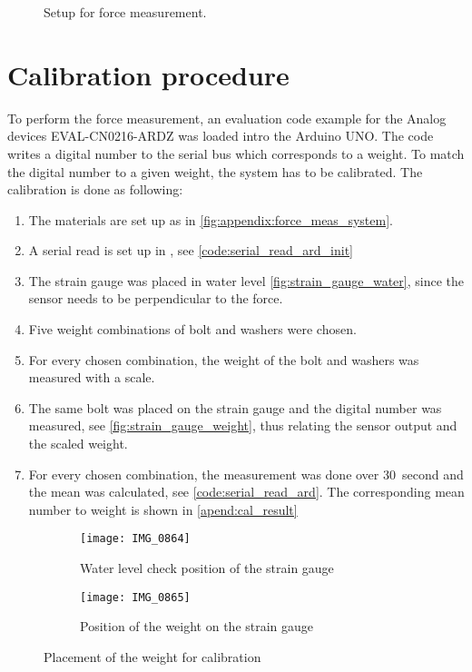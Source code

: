 \begin{figure}[H]
\centering
\def\svgwidth{\columnwidth}

%
\caption{Setup for force measurement.}
		\label{fig:appendix:force_meas_system}
\end{figure}

\section*{Calibration procedure}
To perform the force measurement, an evaluation code example for the Analog devices EVAL-CN0216-ARDZ was loaded intro the Arduino UNO. The code writes a digital number to the serial bus which corresponds to a weight. To match the digital number to a given weight, the system has to be calibrated. The calibration is done as following: 

\begin{enumerate}
\item The materials are set up as in \autoref{fig:appendix:force_meas_system}.
\item A serial read is set up in \matlab, see \autoref{code:serial_read_ard_init}
\item The strain gauge was placed in water level \autoref{fig:strain_gauge_water}, since the sensor needs to be perpendicular to the force.
\item  Five weight combinations of bolt and washers were chosen.
\item  For every chosen combination, the weight of the bolt and washers was measured with a scale.
\item The same bolt was placed on the strain gauge and the digital number was measured, see \autoref{fig:strain_gauge_weight}, thus relating the sensor output and the scaled weight. 
\item For every chosen combination, the measurement was done over \SI{30}{second} and the mean was calculated, see \autoref{code:serial_read_ard}. The corresponding mean number to weight is shown in \autoref{apend:cal_result}
\end{enumerate}

\begin{figure}[H]
\centering
\begin{subfigure}[htbp]{0.45\textwidth}
		\texttt{[image: IMG\_0864]}
		\caption{Water level check position of the strain gauge}
		\label{fig:strain_gauge_water}
\end{subfigure}\vspace{10pt}
\begin{subfigure}[htbp]{0.45\textwidth}
		\texttt{[image: IMG\_0865]}
		\caption{Position of the weight on the strain gauge}
		\label{fig:strain_gauge_weight}
\end{subfigure} \hspace{10pt}
\caption{Placement of the weight for calibration}
\label{fig:bc_weight_meas}
\end{figure}


